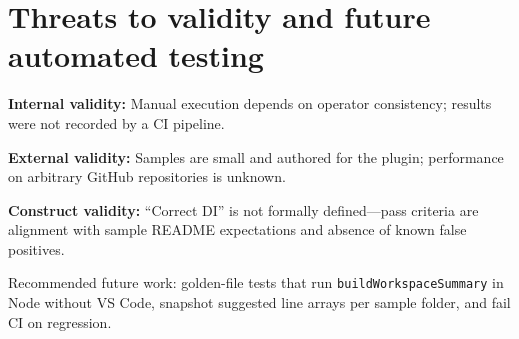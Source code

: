 \section{Threats to validity and future automated testing}
\label{chap5:threats}

\textbf{Internal validity:} Manual execution depends on operator consistency; results were not recorded by a CI pipeline.

\textbf{External validity:} Samples are small and authored for the plugin; performance on arbitrary GitHub repositories is unknown.

\textbf{Construct validity:} ``Correct DI'' is not formally defined---pass criteria are alignment with sample README expectations and absence of known false positives.

Recommended future work: golden-file tests that run \texttt{buildWorkspaceSummary} in Node without VS Code, snapshot suggested line arrays per sample folder, and fail CI on regression.
